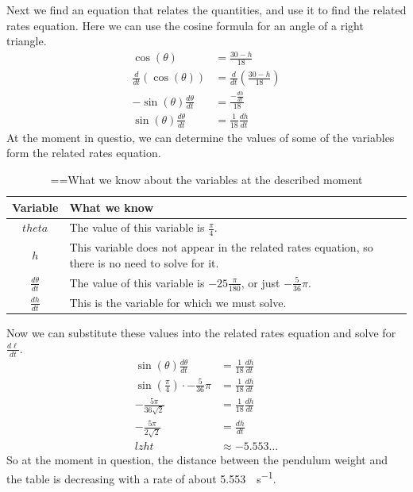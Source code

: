 \documentclass[10pt,oneside,]{book}
\theoremstyle{plain}
\theoremstyle{definition}
\numberwithin{equation}{section}
\newcommand{\fe}[2]{#1\mathopen{}\left(#2\right)\mathclose{}}
\newcommand{\lz}[2]{\frac{d#1}{d#2}}
\newcommand{\lzoo}[2]{{\frac{d}{d#1}}{\left(#2\right)}}
\begin{document}
\par
Next we find an equation that relates the quantities, and use it to find the related rates equation. Here we can use the cosine formula for an angle of a right triangle.\begin{align*}
\fe{\cos}{\theta}&=\frac{30-h}{18}\\
\lzoo{t}{\fe{\cos}{\theta}}&=\lzoo{t}{\frac{30-h}{18}}\\
-\fe{\sin}{\theta}\lz{\theta}{t}&=\frac{-\lz{h}{t}}{18}\\
\fe{\sin}{\theta}\lz{\theta}{t}&=\frac{1}{18}\lz{h}{t}
\end{align*}At the moment in questio, we can determine the values of some of the variables form the related rates equation.%
\begin{table}
\centering
\caption{\binoppenalty=\maxdimen \relpenalty=\maxdimen What we know about the variables at the described moment\label{table-48}}
\begin{tabular}{cp{4in}}
\toprule
Variable&What we know\\
\midrule
\(theta\)&The value of this variable is \(\frac{\pi}{4}\).\\
\midrule
\(h\)&This variable does not appear in the related rates equation, so there is no need to solve for it.\\
\midrule
\(\lz{\theta}{t}\)&The value of this variable is \(-25\frac{\pi}{180}\), or just \(-\frac{5}{36}\pi\).\\
\midrule
\(\lz{h}{t}\)&This is the variable for which we must solve.\\
\bottomrule
\end{tabular}
\end{table}
\par
Now we can substitute these values into the related rates equation and solve for \(\lz{\ell}{t}\).\begin{align*}
\fe{\sin}{\theta}\lz{\theta}{t}&=\frac{1}{18}\lz{h}{t}\\
\fe{\sin}{\frac{\pi}{4}}\cdot-\frac{5}{36}\pi&=\frac{1}{18}\lz{h}{t}\\
-\frac{5\pi}{36\sqrt{2}}&=\frac{1}{18}\lz{h}{t}\\
-\frac{5\pi}{2\sqrt{2}}&=\lz{h}{t}\\
lz{h}{t}&\approx-5.553\ldots
\end{align*}So at the moment in question, the distance between the pendulum weight and the table is decreasing with a rate of about \SI{5.553}{\inch\per\second}.%
\par\smallskip
\end{document}

